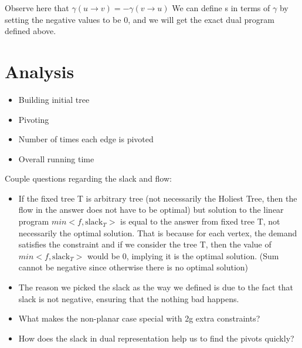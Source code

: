 \documentclass{article}
\begin{document}
Observe here that $\gamma (u \rightarrow v) = - \gamma (v \rightarrow u)$
We can define s in terms of $\gamma $ by setting the negative values to be 0, 
and we will get the exact dual program defined above.

\section{Analysis}
\begin{itemize}
\item Building initial tree
\item Pivoting
\item Number of times each edge is pivoted
\item Overall running time
\end{itemize}

Couple questions regarding the slack and flow:
\begin{itemize}
\item If the fixed tree T is arbitrary tree (not necessarily the Holiest Tree, 
then the flow in the answer does not have to be optimal) but solution to the 
linear program $min <f, \text{slack}_T>$ is equal to the answer from fixed tree T, 
not necessarily the optimal solution. That is because for each vertex, the 
demand satisfies the constraint and if we consider the tree T, then the value of 
$min <f, \text{slack}_T>$ would be 0, implying it is the optimal solution. 
(Sum cannot be negative since otherwise there is no optimal solution)
\item The reason we picked the slack as the way we defined is due to the fact 
that slack is not negative, ensuring that the nothing bad happens.
\item What makes the non-planar case special with 2g extra constraints?
\item How does the slack in dual representation help us to find the pivots quickly?
\end{itemize}
\end{document}
